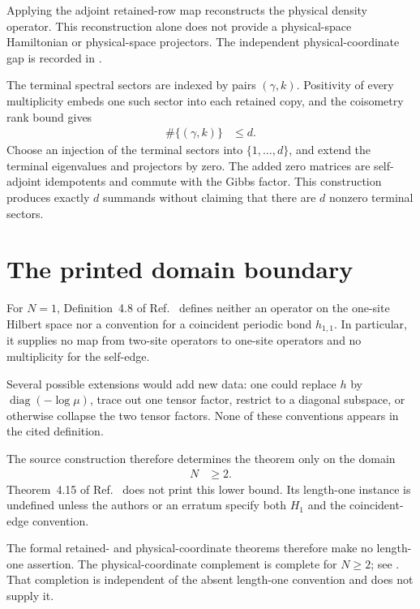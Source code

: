 \documentclass{article}
\begin{document}
Applying the adjoint retained-row map reconstructs the physical density
operator. This reconstruction alone does not provide a physical-space
Hamiltonian or physical-space projectors. The independent physical-coordinate
gap is recorded in
.

The terminal spectral sectors are indexed by pairs $(\gamma,k)$. Positivity of
every multiplicity embeds one such sector into each retained copy, and the
coisometry rank bound gives
\begin{align}
    \#\{(\gamma,k)\}
        &\leq d.
    \label{eq:cpsv16_topological_gibbs_length_one_sector_bound}
\end{align}
Choose an injection of the terminal sectors into
$\{1,\ldots,d\}$, and extend the terminal eigenvalues and projectors by zero.
The added zero matrices are self-adjoint idempotents and commute with the
Gibbs factor. This construction produces exactly $d$ summands without claiming
that there are $d$ nonzero terminal sectors.

\section{The printed domain boundary}

For $N=1$, Definition~4.8 of
Ref.~\cite[lines~829--847]{Cirac2016MPDO_arXiv} defines neither an operator on
the one-site Hilbert space nor a convention for a coincident periodic bond
$h_{1,1}$. In particular, it supplies no map from two-site operators to
one-site operators and no multiplicity for the self-edge.

Several possible extensions would add new data: one could replace $h$ by
$\operatorname{diag}(-\log\mu)$, trace out one tensor factor, restrict to a
diagonal subspace, or otherwise collapse the two tensor factors. None of these
conventions appears in the cited definition.

The source construction therefore determines the theorem only on the domain
\begin{align}
    N
        &\geq 2.
    \label{eq:cpsv16_topological_gibbs_length_one_defined_domain}
\end{align}
Theorem~4.15 of Ref.~\cite[lines~999--1016]{Cirac2016MPDO_arXiv} does not print
this lower bound. Its length-one instance is undefined unless the authors or
an erratum specify both $H_1$ and the coincident-edge convention.

The formal retained- and physical-coordinate theorems therefore make no
length-one assertion. The physical-coordinate complement is complete for
$N\geq2$; see
. That
completion is independent of the absent length-one convention and does not
supply it.



\end{document}
